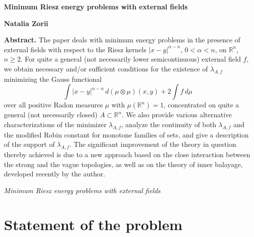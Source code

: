 \documentclass[12pt,a4paper,reqno]{amsart} %
\theoremstyle{lause}
\theoremstyle{maaritelma}
\theoremstyle{lause}
\theoremstyle{maaritelma}
\numberwithin{equation}{section}
\begin{document}
\thispagestyle{empty}


\begin{center}

{\large{\textbf{Minimum Riesz energy problems with external fields}}}

\vspace{18pt}

\textbf{Natalia Zorii}

\vspace{18pt}

\footnotesize{\address{Institute of Mathematics, Academy of Sciences
of Ukraine, Tereshchenkivska~3, 01601,
Kyiv-4, Ukraine\\
natalia.zorii@gmail.com }}

\end{center}

\vspace{12pt}

{\footnotesize{\textbf{Abstract.} The paper deals with minimum energy problems in the presence of external fields with respect to the Riesz kernels $|x-y|^{\alpha-n}$, $0<\alpha<n$, on $\mathbb R^n$, $n\geqslant2$.
For quite a general (not necessarily lower semicontinuous) external field $f$, we obtain necessary and/or sufficient conditions for the existence of $\lambda_{A,f}$ minimizing the Gauss functional
\[\int|x-y|^{\alpha-n}\,d(\mu\otimes\mu)(x,y)+2\int f\,d\mu\]
over all positive Radon measures $\mu$ with $\mu(\mathbb R^n)=1$, concentrated on quite a general (not necessarily closed) $A\subset\mathbb R^n$. We also provide various alternative characterizations of the minimizer $\lambda_{A,f}$, analyze the continuity of both $\lambda_{A,f}$ and the modified Robin constant for monotone families of sets, and give a description of the support of $\lambda_{A,f}$. The significant improvement of the theory in question thereby achieved
is due to a new approach based on the close interaction between the strong and the vague topologies, as well as on
the theory of inner balayage, developed recently by the author.
}}

\vspace{6pt}

 {\emph{Minimum Riesz energy problems with external fields}}

\section{Statement of the problem}\label{sec-intr}
\end{document}
